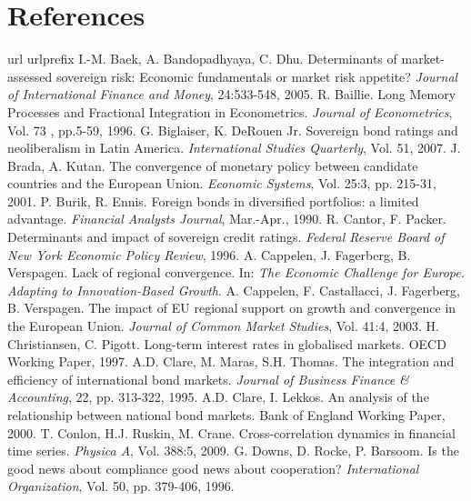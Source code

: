 \documentclass[3p]{elsarticle}
\begin{document}
\section*{References}
\doublespacing
\begin{thebibliography}
\expandafter\ifx\csname url\endcsname\relax
 \def\url#1{\texttt{#1}}\fi
\expandafter\ifx\csname urlprefix\endcsname\relax\def\urlprefix{URL }\fi
{} I.-M. Baek, A. Bandopadhyaya, C. Dhu. Determinants of market-assessed sovereign risk: Economic fundamentals or market risk appetite? \textit{Journal of International Finance and Money}, 24:533-548, 2005.
 R. Baillie. Long Memory Processes and Fractional Integration in Econometrics. \textit{Journal of Econometrics}, Vol. 73 , pp.5-59, 1996.
 G. Biglaiser, K. DeRouen Jr. Sovereign bond ratings and neoliberalism in Latin America. \textit{International Studies Quarterly}, Vol. 51, 2007.
 J. Brada, A. Kutan. The convergence of monetary policy between candidate countries and the European Union. \textit{Economic Systems}, Vol. 25:3, pp. 215-31, 2001.
 P. Burik, R. Ennis. Foreign bonds in diversified portfolios: a limited advantage. \textit{Financial Analysts Journal}, Mar.-Apr., 1990.
 R. Cantor, F. Packer. Determinants and impact of sovereign credit ratings. \textit{Federal Reserve Board of New York Economic Policy Review}, 1996.
 A. Cappelen, J. Fagerberg, B. Verspagen. Lack of regional convergence. In: \textit{The Economic Challenge for Europe. Adapting to Innovation-Based Growth}.
 A. Cappelen, F. Castallacci, J. Fagerberg, B. Verspagen. The impact of EU regional support on growth and convergence in the European Union. \textit{Journal of Common Market Studies}, Vol. 41:4, 2003.
 H. Christiansen, C. Pigott. Long-term interest rates in globalised markets. OECD Working Paper, 1997.
 A.D. Clare, M.  Maras, S.H. Thomas. The integration and efficiency of international bond markets. \textit{Journal of Business Finance \& Accounting}, 22, pp. 313-322, 1995.
 A.D. Clare, I. Lekkos. An analysis of the relationship between national bond markets. Bank of England Working Paper, 2000.
 T. Conlon, H.J. Ruskin, M. Crane. Cross-correlation dynamics in financial time series. \textit{Physica A}, Vol. 388:5, 2009.
 G. Downs, D. Rocke, P. Barsoom. Is the good news about compliance good news about cooperation? \textit{International Organization}, Vol. 50, pp. 379-406, 1996.

\end{thebibliography}
\end{document}
